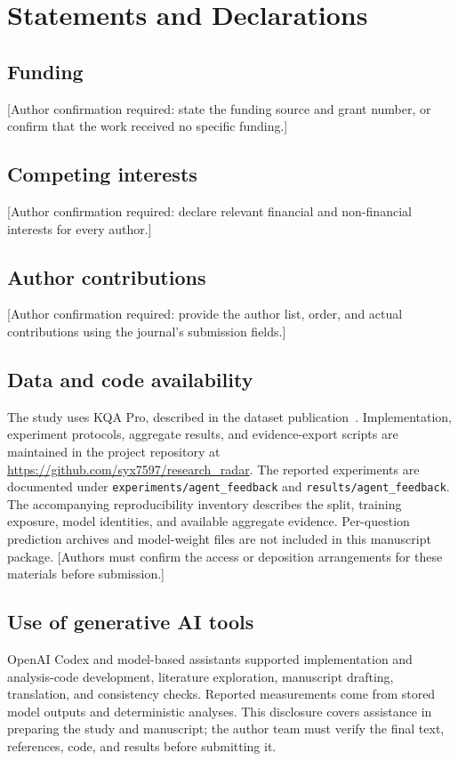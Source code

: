 \section*{Statements and Declarations}

\subsection*{Funding}
[Author confirmation required: state the funding source and grant number, or confirm that the work received no specific funding.]

\subsection*{Competing interests}
[Author confirmation required: declare relevant financial and non-financial interests for every author.]

\subsection*{Author contributions}
[Author confirmation required: provide the author list, order, and actual contributions using the journal's submission fields.]

\subsection*{Data and code availability}
The study uses KQA Pro, described in the dataset publication~\cite{cao2022kqapro}. Implementation, experiment protocols, aggregate results, and evidence-export scripts are maintained in the project repository at \url{https://github.com/syx7597/research_radar}. The reported experiments are documented under \texttt{experiments/agent\_feedback} and \texttt{results/agent\_feedback}. The accompanying reproducibility inventory describes the split, training exposure, model identities, and available aggregate evidence. Per-question prediction archives and model-weight files are not included in this manuscript package. [Authors must confirm the access or deposition arrangements for these materials before submission.]

\subsection*{Use of generative AI tools}
OpenAI Codex and model-based assistants supported implementation and analysis-code development, literature exploration, manuscript drafting, translation, and consistency checks. Reported measurements come from stored model outputs and deterministic analyses. This disclosure covers assistance in preparing the study and manuscript; the author team must verify the final text, references, code, and results before submitting it.

